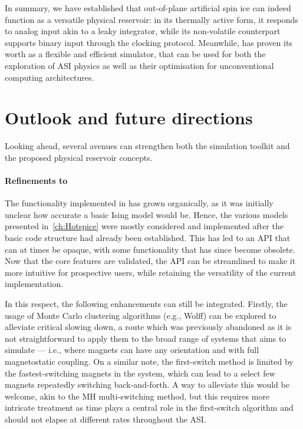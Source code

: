In summary, we have established that out-of-plane artificial spin ice can indeed function as a versatile physical reservoir: in its thermally active form, it responds to analog input akin to a leaky integrator, while its non-volatile counterpart supports binary input through the clocking protocol. %
Meanwhile, \hotspice has proven its worth as a flexible and efficient simulator, that can be used for both the exploration of ASI physics as well as their optimisation for unconventional computing architectures.

\newpage
\section{Outlook and future directions}
Looking ahead, several avenues can strengthen both the simulation toolkit and the proposed physical reservoir concepts.

\paragraph{Refinements to \hotspice}
The functionality implemented in \hotspice has grown organically, as it was initially unclear how accurate a basic Ising model would be.
Hence, the various models presented in~\cref{ch:Hotspice} were mostly considered and implemented after the basic code structure had already been established.
This has led to an API that can at times be opaque, with some functionality that has since become obsolete.
Now that the core features are validated, the API can be streamlined to make it more intuitive for prospective users, while retaining the versatility of the current implementation. \par
In this respect, the following enhancements can still be integrated.
Firstly, the usage of Monte Carlo clustering algorithms (e.g., Wolff) can be explored to alleviate critical slowing down, a route which was previously abandoned as it is not straightforward to apply them to the broad range of systems that \hotspice aims to simulate --- i.e., where magnets can have any orientation and with full magnetostatic coupling.
On a similar note, the first-switch method is limited by the fastest-switching magnets in the system, which can lead to a select few magnets repeatedly switching back-and-forth.
A way to alleviate this would be welcome, akin to the MH multi-switching method, but this requires more intricate treatment as time plays a central role in the first-switch algorithm and should not elapse at different rates throughout the ASI. \\\par

